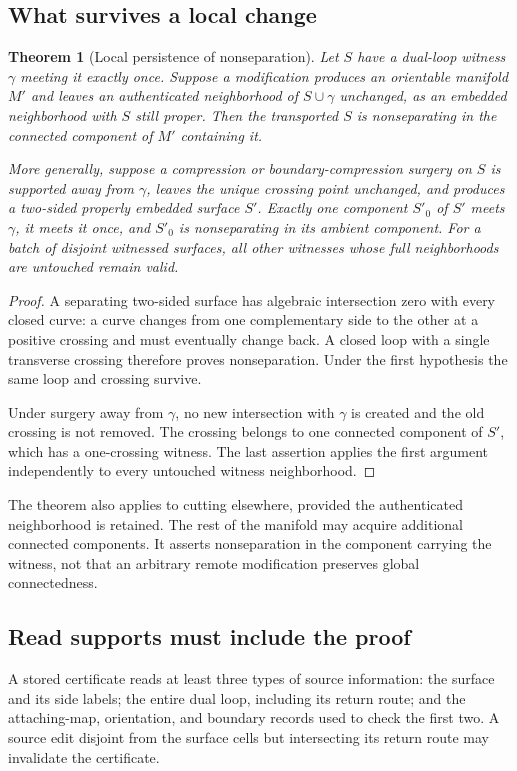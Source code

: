 \documentclass[11pt]{article}
\newtheorem{theorem}{Theorem}[section]
\theoremstyle{definition}
\begin{document}
\subsection{What survives a local change}
\begin{theorem}[Local persistence of nonseparation]\label{thm:persistence}
Let $S$ have a dual-loop witness $\gamma$ meeting it exactly once. Suppose a modification produces an orientable manifold $M'$ and leaves an authenticated neighborhood of $S\cup\gamma$ unchanged, as an embedded neighborhood with $S$ still proper. Then the transported $S$ is nonseparating in the connected component of $M'$ containing it.

More generally, suppose a compression or boundary-compression surgery on $S$ is supported away from $\gamma$, leaves the unique crossing point unchanged, and produces a two-sided properly embedded surface $S'$. Exactly one component $S'_0$ of $S'$ meets $\gamma$, it meets it once, and $S'_0$ is nonseparating in its ambient component. For a batch of disjoint witnessed surfaces, all other witnesses whose full neighborhoods are untouched remain valid.
\end{theorem}
\begin{proof}
A separating two-sided surface has algebraic intersection zero with every closed curve: a curve changes from one complementary side to the other at a positive crossing and must eventually change back. A closed loop with a single transverse crossing therefore proves nonseparation. Under the first hypothesis the same loop and crossing survive.

Under surgery away from $\gamma$, no new intersection with $\gamma$ is created and the old crossing is not removed. The crossing belongs to one connected component of $S'$, which has a one-crossing witness. The last assertion applies the first argument independently to every untouched witness neighborhood.
\end{proof}

The theorem also applies to cutting elsewhere, provided the authenticated neighborhood is retained. The rest of the manifold may acquire additional connected components. It asserts nonseparation in the component carrying the witness, not that an arbitrary remote modification preserves global connectedness.

\subsection{Read supports must include the proof}
A stored certificate reads at least three types of source information: the surface and its side labels; the entire dual loop, including its return route; and the attaching-map, orientation, and boundary records used to check the first two. A source edit disjoint from the surface cells but intersecting its return route may invalidate the certificate.
\end{document}
